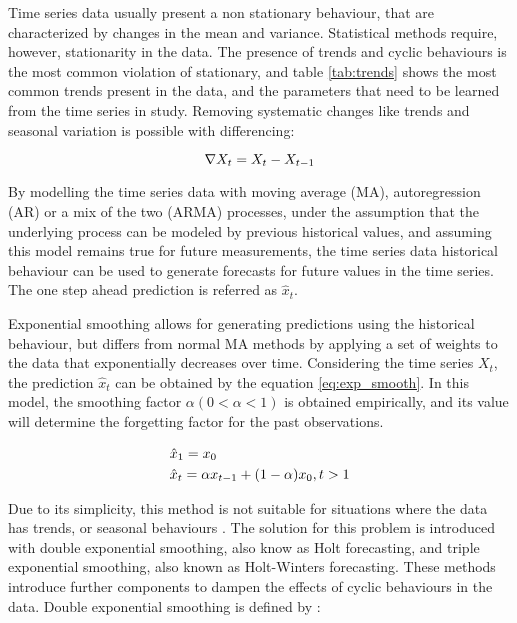 \par Time series data usually present a non stationary behaviour, that are characterized by changes in the mean and variance. Statistical methods require, however, stationarity in the data. The presence of trends and cyclic behaviours
is the most common violation of stationary, and table \ref{tab:trends} shows the most common trends present in the data, and the parameters that need to be learned from the time series in study. Removing systematic changes like trends
and seasonal variation is possible with differencing:

\begin {equation*}
\centering
\nabla X_t = X_t - X_{t-1}
\end {equation*}

\par By modelling the time series data with moving average (MA), autoregression (AR) or a mix of the two (ARMA) processes, under the assumption that the underlying
process can be modeled by previous historical values, and assuming this model remains true for future measurements, the time series data historical behaviour can
be used to generate forecasts for future values in the time series. The one step ahead prediction is referred as $\hat{x}_t$.

\par Exponential smoothing allows for generating predictions using the historical behaviour, but differs from normal MA methods by applying a set of weights to the
data that exponentially decreases over time. Considering the time series $X_t$, the prediction $\hat{x}_t$ can be obtained by the equation \ref{eq:exp_smooth}. 
In this model, the smoothing factor $\alpha (0 < \alpha < 1)$ is obtained empirically, and its value will determine the forgetting factor for the past observations.

\begin {equation*}
\centering
\begin {split}
&\hat{x}_1 = x_0 \\
&\hat{x}_t = \alpha x_{t-1} + (1-\alpha)x_0, t > 1
\end {split}
\label{eq:exp_smooth}
\end {equation*}

\par Due to its simplicity, this method is not suitable for situations where the data has trends, or seasonal behaviours \cite{kalekar_time_2004}. The solution for
this problem is introduced with double exponential smoothing, also know as Holt forecasting, and triple exponential smoothing, also known as Holt-Winters
forecasting. These methods introduce further components to dampen the effects of cyclic behaviours in the data. Double exponential smoothing is defined by
\cite{munz_traffic_2010} :

